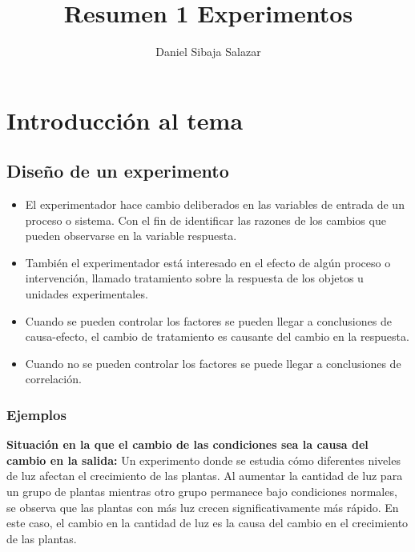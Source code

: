 \documentclass[
]{article}
\title{Resumen 1 Experimentos}
\author{Daniel Sibaja Salazar}
\date{}
\begin{document}
\maketitle

{
\setcounter{tocdepth}{2}
\tableofcontents
}
\section{Introducción al tema}\label{introducciuxf3n-al-tema}

\subsection{Diseño de un experimento}\label{diseuxf1o-de-un-experimento}

\begin{itemize}
\item
  El experimentador hace cambio deliberados en las variables de entrada
  de un proceso o sistema. Con el fin de identificar las razones de los
  cambios que pueden observarse en la variable respuesta.
\item
  También el experimentador está interesado en el efecto de algún
  proceso o intervención, llamado tratamiento sobre la respuesta de los
  objetos u unidades experimentales.
\item
  Cuando se pueden controlar los factores se pueden llegar a
  conclusiones de causa-efecto, el cambio de tratamiento es causante del
  cambio en la respuesta.
\item
  Cuando no se pueden controlar los factores se puede llegar a
  conclusiones de correlación.
\end{itemize}

\subsubsection{Ejemplos}\label{ejemplos}

\textbf{Situación en la que el cambio de las condiciones sea la causa
del cambio en la salida:} Un experimento donde se estudia cómo
diferentes niveles de luz afectan el crecimiento de las plantas. Al
aumentar la cantidad de luz para un grupo de plantas mientras otro grupo
permanece bajo condiciones normales, se observa que las plantas con más
luz crecen significativamente más rápido. En este caso, el cambio en la
cantidad de luz es la causa del cambio en el crecimiento de las plantas.
\end{document}
